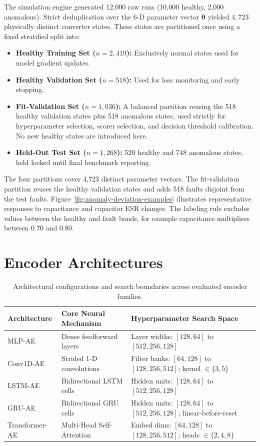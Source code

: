 \documentclass[11pt,a4paper]{article}
\begin{document}
The simulation engine generated 12,000 raw runs (10,000 healthy, 2,000 anomalous). Strict deduplication over the 6-D parameter vector $\boldsymbol{\theta}$ yielded $4{,}723$ physically distinct converter states. These states are partitioned once using a fixed stratified split into:
\begin{itemize}
    \item \textbf{Healthy Training Set ($n=2{,}419$):} Exclusively normal states used for model gradient updates.
    \item \textbf{Healthy Validation Set ($n=518$):} Used for loss monitoring and early stopping.
    \item \textbf{Fit-Validation Set ($n=1{,}036$):} A balanced partition reusing the 518 healthy validation states plus 518 anomalous states, used strictly for hyperparameter selection, scorer selection, and decision threshold calibration. No new healthy states are introduced here.
    \item \textbf{Held-Out Test Set ($n=1{,}268$):} 520 healthy and 748 anomalous states, held locked until final benchmark reporting.
\end{itemize}
The four partitions cover 4,723 distinct parameter vectors. The fit-validation partition reuses the healthy validation states and adds 518 faults disjoint from the test faults. Figure~\ref{fig:anomaly-deviation-examples} illustrates representative responses to capacitance and capacitor ESR changes. The labeling rule excludes values between the healthy and fault bands, for example capacitance multipliers between 0.70 and 0.80.

\section{Encoder Architectures}
\label{sec:baselines}

\begin{table}[t]
\centering
\small
\caption{Architectural configurations and search boundaries across evaluated encoder families.}
\label{tab:architectures}
\begin{tabular}{@{}llp{7.2cm}@{}}
\toprule
Architecture & Core Neural Mechanism & Hyperparameter Search Space \\
\midrule
MLP-AE & Dense feedforward layers~\cite{rumelhart1986backprop} & Layer widths: $[128,64]$ to $[512,256,128]$ \\
Conv1D-AE & Strided 1-D convolutions~\cite{kiranyaz2019survey} & Filter banks: $[64,128]$ to $[128,256,512]$; kernel $\in \{3,5\}$ \\
LSTM-AE & Bidirectional LSTM cells~\cite{hochreiter1997lstm} & Hidden units: $[128,64]$ to $[512,256,128]$ \\
GRU-AE & Bidirectional GRU cells~\cite{cho2014gru} & Hidden units: $[128,64]$ to $[512,256,128]$; linear-before-reset \\
Transformer-AE & Multi-Head Self-Attention~\cite{vaswani2017attention} & Embed dims: $[64,128]$ to $[128,256,512]$; heads $\in \{2,4,8\}$ \\
\bottomrule
\end{tabular}
\end{table}
\end{document}
